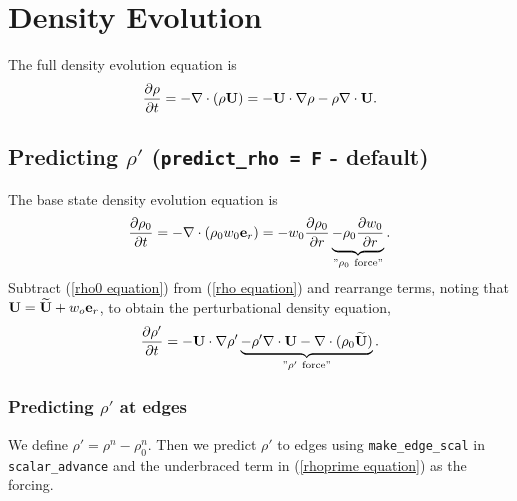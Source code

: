 
\section{Density Evolution}
The full density evolution equation is
\begin{equation}
\frac{\partial\rho}{\partial t} = -\nabla\cdot(\rho{\bf U}) = -{\bf U}\cdot\nabla\rho 
- \rho\nabla\cdot{\bf U}. \label{rho equation}
\end{equation}
\subsection{Predicting $\rho'$ ({\tt predict\_rho = F} - default)}
The base state density evolution equation is
\begin{equation}
\frac{\partial\rho_0}{\partial t} = -\nabla\cdot(\rho_0 w_0 {\bf e}_r) = 
-w_0\frac{\partial\rho_0}{\partial r} 
\underbrace{-\rho_0\frac{\partial w_0}{\partial r}}_{"\rho_0 ~ \text{force}"}.
\label{rho0 equation}
\end{equation}
Subtract (\ref{rho0 equation}) from (\ref{rho equation}) and rearrange terms, noting that 
${\bf U} = \widetilde{{\bf U}} + w_o{\bf e}_r$, to obtain the perturbational density equation,
\begin{equation}
\frac{\partial\rho'}{\partial t} = -{\bf U}\cdot\nabla\rho' \underbrace{- \rho'\nabla\cdot{\bf U} 
- \nabla\cdot(\rho_0\widetilde{{\bf U}})}_{"\rho' ~ \text{force}"}. 
\label{rhoprime equation}
\end{equation}
\subsubsection{Predicting $\rho'$ at edges}
We define $\rho' = \rho^n - \rho_0^n$.  Then we predict $\rho'$ to edges using 
{\tt make\_edge\_scal} in {\tt scalar\_advance} and the underbraced term in (\ref{rhoprime equation}) 
as the forcing.
